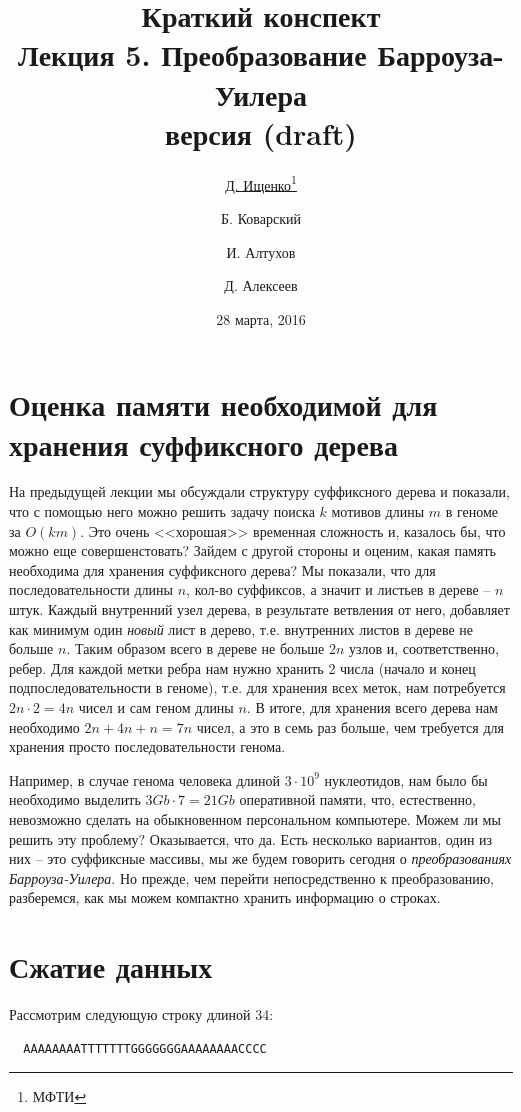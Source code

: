 \documentclass[letterpaper, 11pt]{article}
\title{\large{Краткий конспект}\\
\LARGE{Лекция 5. Преобразование Барроуза-Уилера}\\
\normalsize версия \versionnumber (\textcolor{NavyBlue}{draft})}
\date{28 марта, 2016}
\author{\underline{Д. Ищенко\thanks{МФТИ}} \and Б. Коварский\footnotemark[1]
\and И. Алтухов\footnotemark[1] \and Д. Алексеев\footnotemark[1]}
\begin{document}
\maketitle
\thispagestyle{empty}
\clearpage

\section{Оценка памяти необходимой для хранения суффиксного дерева}

На предыдущей лекции мы обсуждали структуру суффиксного дерева и показали, что с помощью него можно решить задачу поиска $k$ мотивов длины $m$ в геноме за $O(km)$. Это очень <<хорошая>> временная сложность и, казалось бы, что можно еще совершенстовать? Зайдем с другой стороны и оценим, какая память необходима для хранения суффиксного дерева? Мы показали, что для последовательности длины $n$, кол-во суффиксов, а значит и листьев в дереве -- $n$ штук. Каждый внутренний узел дерева, в результате ветвления от него, добавляет как минимум один \textit{новый} лист в дерево, т.е. внутренних листов в дереве не больше $n$. Таким образом всего в дереве не больше $2n$ узлов и, соответственно, ребер. Для каждой метки ребра нам нужно хранить 2 числа (начало и конец подпоследовательности в геноме), т.е. для хранения всех меток, нам потребуется $2n \cdot 2 = 4n$ чисел и сам геном длины $n$. В итоге, для хранения всего дерева нам необходимо $2n + 4n + n = 7n$ чисел, а это в семь раз больше, чем требуется для хранения просто последовательности генома.

Например, в случае генома человека длиной $3\cdot10^9$ нуклеотидов, нам было бы необходимо выделить $3Gb \cdot 7 = 21Gb$ оперативной памяти, что, естественно, невозможно сделать на обыкновенном персональном компьютере. Можем ли мы решить эту проблему? Оказывается, что да. Есть несколько вариантов, один из них -- это суффиксные массивы, мы же будем говорить сегодня о \textit{преобразованиях Барроуза-Уилера}. Но прежде, чем перейти непосредственно к преобразованию, разберемся, как мы можем компактно хранить информацию о строках.

\section{Сжатие данных}

Рассмотрим следующую строку длиной 34:
\begin{verbatim}
  AAAAAAAATTTTTTTGGGGGGGAAAAAAAACCCC
\end{verbatim}
\end{document}
